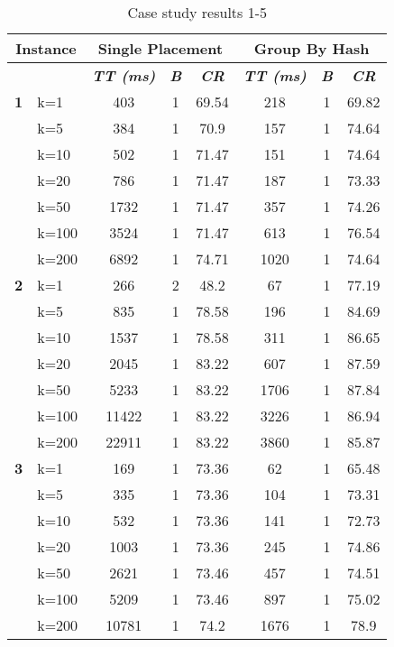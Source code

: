     \begin{table}[htbp]
    \caption{Case study results 1-5}
    \centering
    \begin{tabular}{|l|l|c|c|c|c|c|c|}
    \hline
    \multicolumn{ 2}{|c|}{\textbf{Instance}} & \multicolumn{ 3}{c|}{\textbf{Single Placement}} & \multicolumn{ 3}{c|}{\textbf{Group By Hash}} \\ \hline
    \multicolumn{ 2}{|l|}{} & \textbf{\textit{TT (ms)}} & \textbf{\textit{B}} & \textbf{\textit{CR}} & \textbf{\textit{TT (ms)}} & \textbf{\textit{B}} & \textbf{\textit{CR}} \\ \hline
    \multicolumn{1}{|r|}{\textbf{1}} & k=1 & 403 & 1 & 69.54 & 218 & 1 & 69.82 \\ 
     & k=5 & 384 & 1 & 70.9 & 157 & 1 & 74.64 \\ 
     & k=10 & 502 & 1 & 71.47 & 151 & 1 & 74.64 \\ 
     & k=20 & 786 & 1 & 71.47 & 187 & 1 & 73.33 \\ 
     & k=50 & 1732 & 1 & 71.47 & 357 & 1 & 74.26 \\ 
     & k=100 & 3524 & 1 & 71.47 & 613 & 1 & 76.54 \\ 
     & k=200 & 6892 & 1 & 74.71 & 1020 & 1 & 74.64 \\ \hline
    \multicolumn{1}{|r|}{\textbf{2}} & k=1 & 266 & 2 & 48.2 & 67 & 1 & 77.19 \\ 
     & k=5 & 835 & 1 & 78.58 & 196 & 1 & 84.69 \\ 
     & k=10 & 1537 & 1 & 78.58 & 311 & 1 & 86.65 \\ 
     & k=20 & 2045 & 1 & 83.22 & 607 & 1 & 87.59 \\ 
     & k=50 & 5233 & 1 & 83.22 & 1706 & 1 & 87.84 \\ 
     & k=100 & 11422 & 1 & 83.22 & 3226 & 1 & 86.94 \\ 
     & k=200 & 22911 & 1 & 83.22 & 3860 & 1 & 85.87 \\ \hline
    \multicolumn{1}{|r|}{\textbf{3}} & k=1 & 169 & 1 & 73.36 & 62 & 1 & 65.48 \\ 
     & k=5 & 335 & 1 & 73.36 & 104 & 1 & 73.31 \\ 
     & k=10 & 532 & 1 & 73.36 & 141 & 1 & 72.73 \\ 
     & k=20 & 1003 & 1 & 73.36 & 245 & 1 & 74.86 \\ 
     & k=50 & 2621 & 1 & 73.46 & 457 & 1 & 74.51 \\ 
     & k=100 & 5209 & 1 & 73.46 & 897 & 1 & 75.02 \\ 
     & k=200 & 10781 & 1 & 74.2 & 1676 & 1 & 78.9 \\ \hline

\end{tabular}
\end{table}
